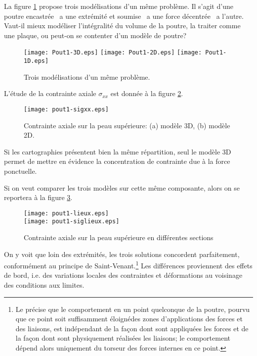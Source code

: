 \bigskip
La figure \ref{Pout1} propose trois modélisations d'un même problème.
Il s'agit d'une poutre encastrée \ a une extrémité et soumise \ a une force
décentrée \ a l'autre.
Vaut-il mieux modéliser l'intégralité du volume de la poutre, la traiter comme
une plaque, ou peut-on se contenter d'un modèle de poutre?
\begin{figure}[ht]
\begin{center}
\texttt{[image: Pout1-3D.eps]} \hfill
\texttt{[image: Pout1-2D.eps]} \hfill
\texttt{[image: Pout1-1D.eps]}
\end{center}
\caption{\label{Pout1} Trois modélisations d'un même problème.}
\end{figure}

\medskip
L'étude de la contrainte axiale $\sigma_{xx}$ est donnée à la figure \ref{Pout1-sigxx}.
\begin{figure}[ht]
\begin{center}
\texttt{[image: pout1-sigxx.eps]}\\[-3mm]
\end{center}
\caption{\label{Pout1-sigxx} Contrainte axiale sur la peau supérieure: (a) modèle 3D,
(b) modèle 2D.}
\end{figure}
Si les cartographies présentent bien la même répartition, seul le modèle 3D
permet de mettre en évidence la concentration de contrainte due à la force ponctuelle.

\medskip
Si on veut comparer les trois modèles sur cette même composante, alors
on se reportera à la figure \ref{Pout1-siglieux}.
\begin{figure}[ht]
\begin{center}
\texttt{[image: pout1-lieux.eps]}\\
\texttt{[image: pout1-siglieux.eps]}\\[-5mm]
\end{center}
\caption{\label{Pout1-siglieux} Contrainte axiale sur la peau supérieure en différentes sections}
\end{figure}
On y voit que loin des extrémités, les trois solutions concordent parfaitement, conformément 
au principe de Saint-Venant.\footnote{Le  précise que le comportement 
en un point quelconque de la poutre, pourvu que ce point soit suffisamment éloignédes zones 
d'applications des forces et des liaisons, est indépendant de la façon dont sont appliquées 
les forces et de la façon dont sont physiquement réalisées les liaisons; le comportement 
dépend alors uniquement du torseur des forces internes en ce point.} 
Les différences proviennent des effets de bord, i.e. des variations 
locales des contraintes et déformations au voisinage des conditions aux limites.

